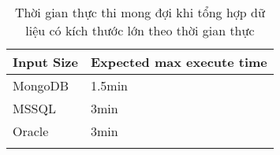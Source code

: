 \begin{longtable}{|l|l|}
\hline
Input   Size & Expected max   execute time \\ \hline
\endfirsthead
%
\endhead
%
MongoDB      & 1.5min                      \\ \hline
MSSQL        & 3min                        \\ \hline
Oracle       & 3min                        \\ \hline
\caption{Thời gian thực thi mong đợi khi tổng hợp dữ liệu có kích thước lớn theo thời gian thực}
\end{longtable}